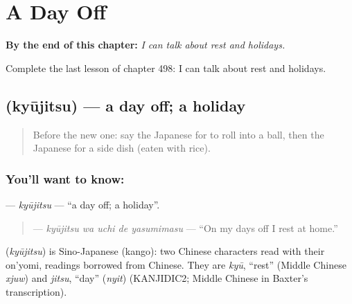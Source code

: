 
\chapter{A Day Off}
\label{ch:ja-a-day-off}

\begin{chapteropening}
\textbf{By the end of this chapter:} \emph{I can talk about rest and holidays.}

Complete the last lesson of chapter 498: I can talk about rest and holidays.
\end{chapteropening}

\section[\texorpdfstring{\ja{きゅうじつ} (kyūjitsu)}{きゅうじつ (kyūjitsu)}]{ (kyūjitsu) — a day off; a holiday}

\label{lesson:JA-C498-kyuujitsu}



\begin{quote}
Before the new one: say the Japanese for to roll into a ball, then the Japanese for a side dish (eaten with rice).
\end{quote}

\subsection*{You'll want to know: }
\textbf{} — \emph{kyūjitsu} — \textquotedblleft{}a day off; a holiday\textquotedblright{}.

\begin{quote}
\textbf{  } — \emph{kyūjitsu wa uchi de yasumimasu} — \textquotedblleft{}On my days off I rest at home.\textquotedblright{}
\end{quote}

\begin{cousinweb}
\textbf{} (\emph{kyūjitsu}) is Sino-Japanese (kango): two Chinese characters read with their on'yomi, readings borrowed from Chinese. They are \emph{kyū}, \textquotedblleft{}rest\textquotedblright{} (Middle Chinese \emph{xjuw}) and \emph{jitsu}, \textquotedblleft{}day\textquotedblright{} (\emph{nyit}) (KANJIDIC2; Middle Chinese in Baxter's transcription).
\end{cousinweb}

